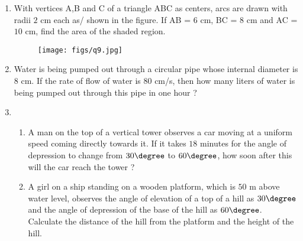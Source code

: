 \begin{enumerate}
        \item With vertices A,B and C of a triangle ABC as centers, arcs are drawn with radii $2$ cm each as/ shown in the figure. If AB = $6$ cm, BC = $8$ cm and AC = $10$ cm, find the area of the shaded region.
        \begin{figure}[h]
                                \centering
                                \texttt{[image: figs/q9.jpg]}
                                \caption{}
                                \label{fig:xxxx}
      \end{figure}
        \item Water is being pumped out through a circular pipe whose internal diameter is $8$ cm. If the rate of flow of water is $80$ cm/s, then how many liters of water is being pumped out through this pipe in one hour ?
        \item 
        \begin{enumerate}
                \item A man on the top of a vertical tower observes a car moving at a uniform speed coming directly towards it. If it takes $18$ minutes for the angle of depression to change from $30\degree$ to $60\degree$, how soon after this will the car reach the tower ?
                \item A girl on a ship standing on a wooden platform, which is $50$ m above water level, observes the angle of elevation of a top of a hill as $30\degree$ and the angle of depression of the base of the hill as $60\degree$. Calculate the distance of the hill from the platform and the height of the hill.
        \end{enumerate}

\end{enumerate}
%
